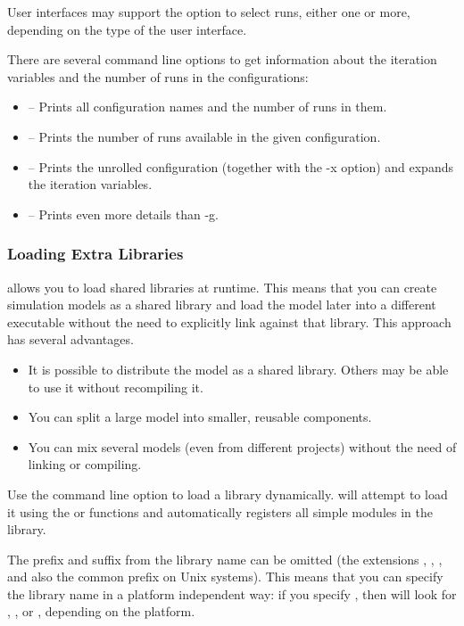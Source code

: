 User interfaces may support the  option to select runs,
either one or more, depending on the type of the user interface.

There are several command line options to get information about the iteration
variables and the number of runs in the configurations:

\begin{itemize}
  \item {} -- Prints all configuration names and the number of runs in them.
  \item {} -- Prints the number of runs available in the given configuration.
  \item {} -- Prints the unrolled configuration (together with the -x option) and
                    expands the iteration variables.
  \item {} -- Prints even more details than -g.
\end{itemize}


\subsubsection{Loading Extra Libraries}

{\opp} allows you to load shared libraries at runtime. This means that you can create
simulation models as a shared library and load the model later into a different executable without
the need to explicitly link against that library. This approach has several advantages.

\begin{itemize}
  \item It is possible to distribute the model as a shared library. Others may be able to use
  it without recompiling it.
  \item You can split a large model into smaller, reusable components.
  \item You can mix several models (even from different projects)
    without the need of linking or compiling.
\end{itemize}

Use the  command line option to load a library dynamically.
{\opp} will attempt to load it using the  or  functions and
automatically registers all simple modules in the library.

The prefix and suffix from the library name can be omitted (the extensions
, , , and also the common  prefix
on Unix systems). This means that you can specify the library name in a
platform independent way: if you specify , then {\opp} will
look for , ,  or ,
depending on the platform.

